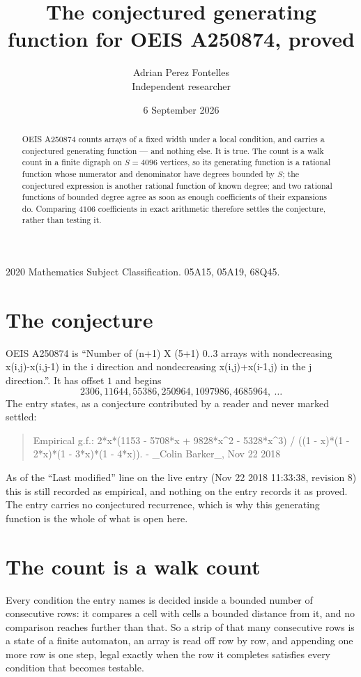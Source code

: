 \documentclass[11pt,a4paper]{article}
\title{The conjectured generating function for OEIS A250874, proved}
\author{Adrian Perez Fontelles\\ \small Independent researcher}
\date{6 September 2026}
\theoremstyle{plain}
\theoremstyle{definition}
\begin{document}
\maketitle

\begin{abstract}
OEIS A250874 counts arrays of a fixed width under a local condition, and carries a conjectured
generating function --- and nothing else. It is true. The count is a walk count in a finite
digraph on $S=4096$ vertices, so its generating function is a rational function whose numerator
and denominator have degrees bounded by $S$; the conjectured expression is another rational
function of known degree; and two rational functions of bounded degree agree as soon as enough
coefficients of their expansions do. Comparing $4106$ coefficients in exact arithmetic
therefore settles the conjecture, rather than testing it.
\end{abstract}

\noindent\small 2020 Mathematics Subject Classification. 05A15, 05A19, 68Q45.\normalsize

\section{The conjecture}

OEIS A250874 is ``Number of (n+1) X (5+1) 0..3 arrays with nondecreasing x(i,j)-x(i,j-1) in the i direction and nondecreasing x(i,j)+x(i-1,j) in the j direction.''. It has offset $1$ and begins
\[
2306, 11644, 55386, 250964, 1097986, 4685964,\ \dots
\]
The entry states, as a conjecture contributed by a reader and never marked settled:
\begin{quote}
Empirical g.f.: 2*x*(1153 - 5708*x + 9828*x\^{}2 - 5328*x\^{}3) / ((1 - x)*(1 - 2*x)*(1 - 3*x)*(1 - 4*x)). - \_Colin Barker\_, Nov 22 2018
\end{quote}
As of the ``Last modified'' line on the live entry (Nov 22 2018 11:33:38, revision 8) this is still
recorded as empirical, and nothing on the entry records it as proved. The entry carries no
conjectured recurrence, which is why this generating function is the whole of what is open
here.

\section{The count is a walk count}

Every condition the entry names is decided inside a bounded number of consecutive rows: it
compares a cell with cells a bounded distance from it, and no comparison reaches further than
that. So a strip of that many consecutive rows is a state of a finite automaton, an array is
read off row by row, and appending one more row is one step, legal exactly when the row it
completes satisfies every condition that becomes testable.
\end{document}
